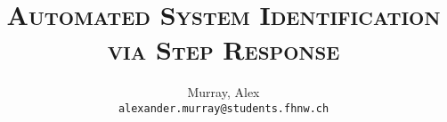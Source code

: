 \author{%
    Murray, Alex\\
    \texttt{alexander.murray@students.fhnw.ch}
}

\title{
    \vspace{20mm}
    \Huge{\textsc{Automated System Identification via Step Response}}
}
